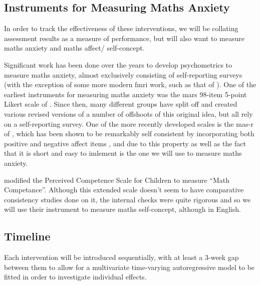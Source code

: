 \documentclass[14pt]{memoir}
\begin{document}
\subsection*{Instruments for Measuring Maths Anxiety}

In order to track the effectiveness of these interventions, we will be collating assessment results as a measure of performance, but will also want to measure maths anxiety and maths affect/ self-concept. 

Significant work has been done over the years to develop psychometrics to measure maths anxiety, almost exclusively consisting of self-reporting surveys (with the exception of some more modern \gls{fmri} work, such as that of ). One of the earliest instruments for measuring maths anxiety was the \gls{mars} 98-item 5-point Likert scale of . Since then, many different groups have split off and created various revised versions of a number of offshoots of this original idea, but all rely on a self-reporting survey. One of the more recently developed scales is the \gls{mas-r} of , which has been shown to be remarkably self consistent by incorporating both positive and negative affect items \cite{Bai2011}, and due to this property as well as the fact that it is short and easy to imlement is the one we will use to measure maths anxiety.

 modified the Perceived Competence Scale for Children \cite{Harter1982} to measure ``Math Competance''. Although this extended scale doesn't seem to have comparative consistency studies done on it, the internal checks  were quite rigorous and so we will use their instrument to measure maths self-concept, although in English.



\subsection*{Timeline}

Each intervention will be introduced sequentially, with at least a 3-week gap between them to allow for a multivariate time-varying autoregressive model to be fitted in order to investigate individual effects. 
\end{document}
